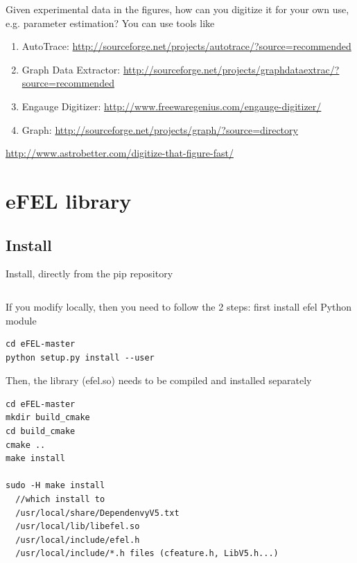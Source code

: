 Given experimental data in the figures, how can you digitize it for your own
use, e.g. parameter estimation? You can use tools like
\begin{enumerate}
  \item AutoTrace:
  \url{http://sourceforge.net/projects/autotrace/?source=recommended}
  \item Graph Data Extractor:
  \url{http://sourceforge.net/projects/graphdataextrac/?source=recommended}
  \item Engauge Digitizer:
  \url{http://www.freewaregenius.com/engauge-digitizer/}
  \item Graph: \url{http://sourceforge.net/projects/graph/?source=directory}
\end{enumerate}
\url{http://www.astrobetter.com/digitize-that-figure-fast/}




\section{eFEL library}
\label{sec:eFEL}


\subsection{Install}


Install, directly from the pip repository
\begin{verbatim}

\end{verbatim}

If you modify locally, then you need to follow the 2 steps: 
first install efel Python module
\begin{verbatim}
cd eFEL-master
python setup.py install --user
\end{verbatim} 

Then, the library (efel.so) needs to be compiled and installed separately
\begin{verbatim}
cd eFEL-master
mkdir build_cmake
cd build_cmake
cmake ..
make install

sudo -H make install  
  //which install to 
  /usr/local/share/DependenvyV5.txt
  /usr/local/lib/libefel.so
  /usr/local/include/efel.h
  /usr/local/include/*.h files (cfeature.h, LibV5.h...)
\end{verbatim} 




